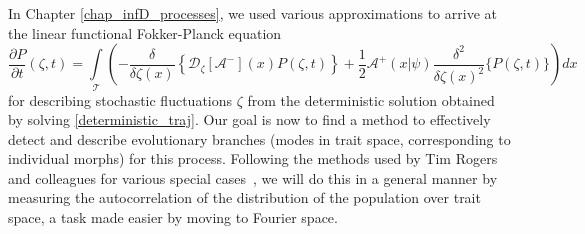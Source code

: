 In Chapter \ref{chap_infD_processes}, we used various approximations to arrive at the linear functional Fokker-Planck equation
\begin{equation}
\label{functional_WNE_for_App}
    \frac{\partial P}{\partial t}(\zeta,t) = \int\limits_{\mathcal{T}}\left(-\frac{\delta}{\delta \zeta(x)}\left\{\mathcal{D}_{\zeta}[\mathcal{A}^{-}](x)P(\zeta,t)\right\}+\frac{1}{2}\mathcal{A}^{+}(x|\psi)\frac{\delta^2}{\delta\zeta(x)^2}\{P(\zeta,t)\}\right)dx
\end{equation}
for describing stochastic fluctuations $\zeta$ from the deterministic solution obtained by solving \eqref{deterministic_traj}. Our goal is now to find a method to effectively detect and describe evolutionary branches (modes in trait space, corresponding to individual morphs) for this process. Following the methods used by Tim Rogers and colleagues for various special cases~\citep{rogers_demographic_2012, rogers_spontaneous_2012, rogers_modes_2015}, we will do this in a general manner by measuring the autocorrelation of the distribution of the population over trait space, a task made easier by moving to Fourier space.
